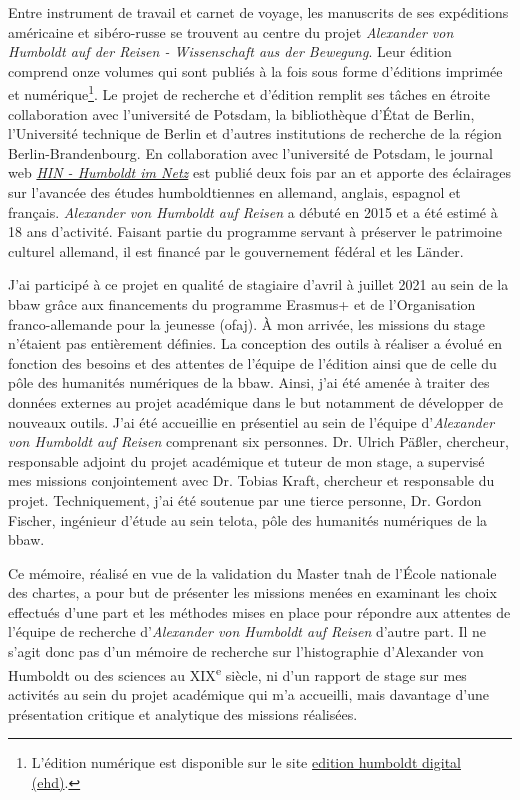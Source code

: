 \documentclass[a4paper, 12pt, twoside]{book}
\begin{document}
Entre instrument de travail et carnet de voyage, les manuscrits de ses expéditions américaine et sibéro-russe se trouvent au centre du projet \textit{Alexander von Humboldt auf der Reisen - Wissenschaft aus der Bewegung}. Leur édition comprend onze volumes qui sont publiés à la fois sous forme d'éditions imprimée et numérique\footnote{L'édition numérique est disponible sur le site \href{https://edition-humboldt.de/}{edition humboldt digital (ehd)}.}. Le projet de recherche et d'édition remplit ses tâches en étroite collaboration avec l'université de Potsdam, la bibliothèque d'État de Berlin, l'Université technique de Berlin et d'autres institutions de recherche de la région Berlin-Brandenbourg. En collaboration avec l'université de Potsdam, le journal web \textit{\href{https://www.hin-online.de/index.php/hin}{HIN - Humboldt im Netz}} est publié deux fois par an et apporte des éclairages sur l'avancée des études humboldtiennes en allemand, anglais, espagnol et français. \textit{Alexander von Humboldt auf Reisen} a débuté en 2015 et a été estimé à 18 ans d'activité. Faisant partie du programme servant à préserver le patrimoine culturel allemand, il est financé par le gouvernement fédéral et les Länder. 

J'ai participé à ce projet en qualité de stagiaire d'avril à juillet 2021 au sein de la \gls{bbaw} grâce aux financements du programme Erasmus+ et de l'Organisation franco-allemande pour la jeunesse (\gls{ofaj}). À mon arrivée, les missions du stage n'étaient pas entièrement définies. La conception des outils à réaliser a évolué en fonction des besoins et des attentes de l'équipe de l'édition ainsi que de celle du pôle des humanités numériques de la \gls{bbaw}. Ainsi, j'ai été amenée à traiter des données externes au projet académique dans le but notamment de développer de nouveaux outils. J'ai été accueillie en présentiel au sein de l'équipe d'\textit{Alexander von Humboldt auf Reisen} comprenant six personnes. Dr. Ulrich Päßler, chercheur, responsable adjoint du projet académique et tuteur de mon stage, a supervisé mes missions conjointement avec Dr. Tobias Kraft, chercheur et responsable du projet. Techniquement, j'ai été soutenue par une tierce personne, Dr. Gordon Fischer, ingénieur d'étude au sein \gls{telota}, pôle des humanités numériques de la \gls{bbaw}.

Ce mémoire, réalisé en vue de la validation du Master \gls{tnah} de l'École nationale des chartes, a pour but de présenter les missions menées en examinant  les choix effectués d'une part et les méthodes mises en place pour répondre aux attentes de l'équipe de recherche d'\textit{Alexander von Humboldt auf Reisen} d'autre part. Il ne s'agit donc pas d'un mémoire de recherche sur l'histographie d'Alexander von Humboldt ou des sciences au XIX\textsuperscript{e} siècle, ni d'un rapport de stage sur mes activités au sein du projet académique qui m'a accueilli, mais davantage d'une présentation critique et analytique des missions réalisées.
\end{document}
